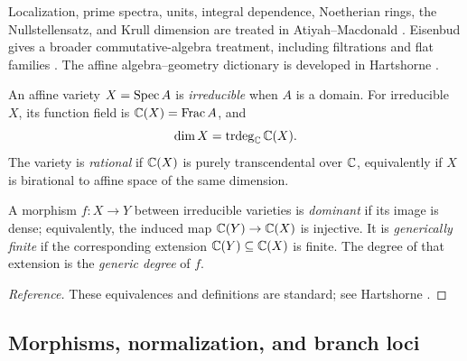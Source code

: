 \begin{remark}\label{rem:textbook-references}
Localization, prime spectra, units, integral dependence, Noetherian rings, the Nullstellensatz, and Krull dimension are treated in Atiyah--Macdonald \cite[Chapters 1, 3, 5, 7, and 11]{AtiyahMacdonald}.  Eisenbud gives a broader commutative-algebra treatment, including filtrations and flat families \cite[Chapters 1--6 and 13]{Eisenbud1995}.  The affine algebra--geometry dictionary is developed in Hartshorne \cite[Chapter I and Chapter II, Sections 2--4]{Hartshorne1977}.
\end{remark}

\begin{definition}\label{def:function-field-rational}
An affine variety $X=\operatorname{Spec} A$ is \emph{irreducible} when $A$ is a domain.  For irreducible $X$, its function field is $\mathbb C(X)=\operatorname{Frac} A$, and
\[
  \dim X=\operatorname{trdeg}_{\mathbb C}\mathbb C(X).
\]
The variety is \emph{rational} if $\mathbb C(X)$ is purely transcendental over $\mathbb C$, equivalently if $X$ is birational to affine space of the same dimension.
\end{definition}

\begin{definition}\label{def:dominant-generically-finite}
A morphism $f\colon X\to Y$ between irreducible varieties is \emph{dominant} if its image is dense; equivalently, the induced map $\mathbb C(Y)\to\mathbb C(X)$ is injective.  It is \emph{generically finite} if the corresponding extension $\mathbb C(Y)\subseteq\mathbb C(X)$ is finite.  The degree of that extension is the \emph{generic degree} of $f$.
\end{definition}

\begin{proof}[Reference]
These equivalences and definitions are standard; see Hartshorne \cite[Chapter I, Section 4]{Hartshorne1977}.
\end{proof}

\subsection{Morphisms, normalization, and branch loci}

